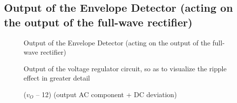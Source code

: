 \subsection{Output of the Envelope Detector (acting on the output of the full-wave rectifier)}

\par
\begin{figure}[H] \centering
\caption{Output of the Envelope Detector (acting on the output of the full-wave rectifier)}
\label{fig:envelope}
\end{figure}



\par
\begin{figure}[H] \centering
\caption{Output of the voltage regulator circuit, so as to visualize the ripple effect in greater detail}
\label{fig:regulator}
\end{figure}

\par
\begin{figure}[H] \centering
\caption{($v_O$ – 12) (output AC component + DC deviation)}
\label{fig:deviation}
\end{figure}









\pagebreak


